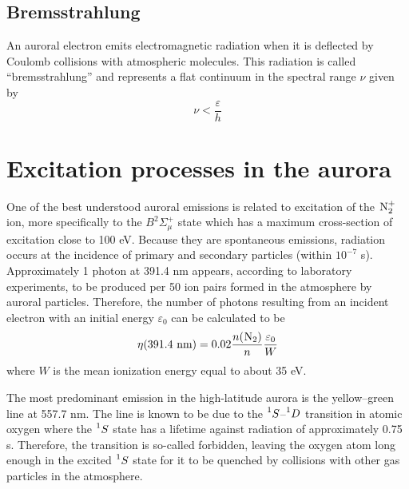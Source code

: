 \subsection{Bremsstrahlung}
An auroral electron emits electromagnetic radiation when it is deflected by Coulomb collisions with atmospheric molecules. This radiation is called ``bremsstrahlung'' and represents a flat continuum in the spectral range \(\nu \) given by
\begin{equation*}
    \nu<\frac{\varepsilon}{h}
\end{equation*}

\section{Excitation processes in the aurora}
One of the best understood auroral emissions is related to excitation of the \(\prescript{}{}{\textnormal{N}}_2^+\) ion, more specifically to the \(B^2\Sigma_\mu^+\) state which has a maximum cross-section of excitation close to 100 eV. Because they are spontaneous emissions, radiation occurs at the incidence of primary and secondary particles (within \(10^{-7}\) s). Approximately 1 photon at 391.4 nm appears, according to laboratory experiments, to be produced per 50 ion pairs formed in the atmosphere by auroral particles. Therefore, the number of photons resulting from an incident electron with an initial energy \(\varepsilon_0\) can be calculated to be
\begin{equation*}
    \eta(391.4\textnormal{ nm})=0.02\frac{n(\prescript{}{}{\textnormal{N}}_2)}{n}\frac{\varepsilon_0}{W}
\end{equation*}
where \(W\) is the mean ionization energy equal to about 35 eV.

The most predominant emission in the high-latitude aurora is the yellow–green line at 557.7 nm. The line is known to be due to the \(\prescript{1}{}{S}\)--\(\prescript{1}{}{D}\) transition in atomic oxygen where the \(\prescript{1}{}{S}\) state has a lifetime against radiation of approximately 0.75 s. Therefore, the transition is so-called forbidden, leaving the oxygen atom long enough in the excited \(\prescript{1}{}{S}\) state for it to be quenched by collisions with other gas particles in the atmosphere.


